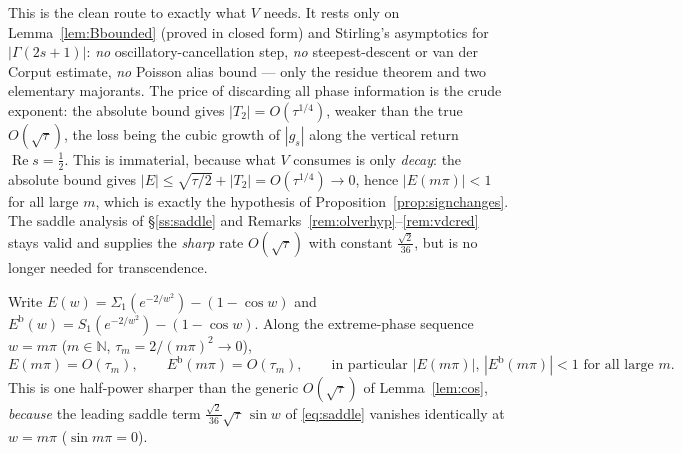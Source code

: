 \noindent This is the clean route to exactly what $V$ needs. It rests only on Lemma~\ref{lem:Bbounded}
\textup(proved in closed form\textup) and Stirling's asymptotics for $|\Gamma(2s+1)|$: \emph{no}
oscillatory-cancellation step, \emph{no} steepest-descent or van der Corput estimate, \emph{no} Poisson alias
bound --- only the residue theorem and two elementary majorants. The price of discarding all phase information
is the crude exponent: the absolute bound gives $|T_2|=O(\tau^{1/4})$, weaker than the true $O(\sqrt\tau)$, the
loss being the cubic growth of $|g_s|$ along the vertical return $\operatorname{Re}s=\tfrac12$. This is
immaterial, because what $V$ consumes is only \emph{decay}: the absolute bound gives
$|E|\le\sqrt{\tau/2}+|T_2|=O(\tau^{1/4})\to0$, hence $|E(m\pi)|<1$ for all large $m$, which is exactly the
hypothesis of Proposition~\ref{prop:signchanges}. The saddle analysis of \S\ref{ss:saddle} and
Remarks~\ref{rem:olverhyp}--\ref{rem:vdcred} stays valid and supplies the \emph{sharp} rate $O(\sqrt\tau)$ with
constant $\tfrac{\sqrt2}{36}$, but is no longer needed for transcendence.

\begin{lemma}\label{lem:extremephase}
Write $E(w)=\Sigma_1(e^{-2/w^2})-(1-\cos w)$ and $E^{\mathrm{b}}(w)=S_1(e^{-2/w^2})-(1-\cos w)$. Along
the extreme-phase sequence $w=m\pi$ ($m\in\mathbb N$, $\tau_m=2/(m\pi)^2\to0$),
\[
   E(m\pi)=O(\tau_m),\qquad E^{\mathrm{b}}(m\pi)=O(\tau_m),
   \qquad\text{in particular }|E(m\pi)|,\,|E^{\mathrm{b}}(m\pi)|<1\text{ for all large }m.
\]
This is one half-power sharper than the generic $O(\sqrt\tau)$ of Lemma~\ref{lem:cos}, \emph{because}
the leading saddle term $\tfrac{\sqrt2}{36}\sqrt\tau\,\sin w$ of \eqref{eq:saddle} vanishes identically
at $w=m\pi$ ($\sin m\pi=0$).
\end{lemma}

